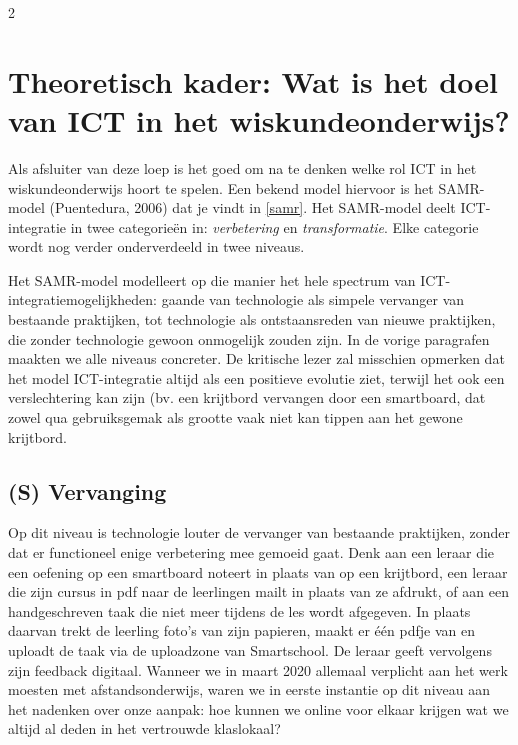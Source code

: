 \begin{multicols}{2}

\section{Theoretisch kader: Wat is het doel van ICT in het wiskundeonderwijs?}
Als afsluiter van deze loep is het goed om na te denken welke rol ICT in het wiskundeonderwijs hoort te spelen. Een bekend model hiervoor is het SAMR-model (Puentedura, 2006) dat je vindt in \autoref{samr}. Het SAMR-model deelt ICT-integratie in twee categorieën in: \textit{verbetering} en \textit{transformatie}. Elke categorie wordt nog verder onderverdeeld in twee niveaus. 

 
Het SAMR-model modelleert op die manier het hele spectrum van ICT-integratiemogelijkheden: gaande van technologie als simpele vervanger van bestaande praktijken, tot technologie als ontstaansreden van nieuwe praktijken, die zonder technologie gewoon onmogelijk zouden zijn. In de vorige paragrafen maakten we alle niveaus concreter. De kritische lezer zal misschien opmerken dat het model ICT-integratie altijd als een positieve evolutie ziet, terwijl het ook een verslechtering kan zijn (bv. een krijtbord vervangen door een smartboard, dat zowel qua gebruiksgemak als grootte vaak niet kan tippen aan het gewone krijtbord.


\subsection*{(S) Vervanging}
Op dit niveau is technologie louter de vervanger van bestaande praktijken, zonder dat er functioneel enige verbetering mee gemoeid gaat. Denk aan een leraar die een oefening op een smartboard noteert in plaats van op een krijtbord, een leraar die zijn cursus in pdf naar de leerlingen mailt in plaats van ze afdrukt, of aan een handgeschreven taak die niet meer tijdens de les wordt afgegeven. In plaats daarvan  trekt de leerling foto’s van zijn papieren, maakt er één pdfje van en uploadt de taak via de uploadzone van Smartschool. De leraar geeft vervolgens zijn feedback digitaal. Wanneer we in maart 2020 allemaal verplicht aan het werk moesten met afstandsonderwijs, waren we in eerste instantie op dit niveau aan het nadenken over onze aanpak: hoe kunnen we online voor elkaar krijgen wat we altijd al deden in het vertrouwde klaslokaal?


\end{multicols}
